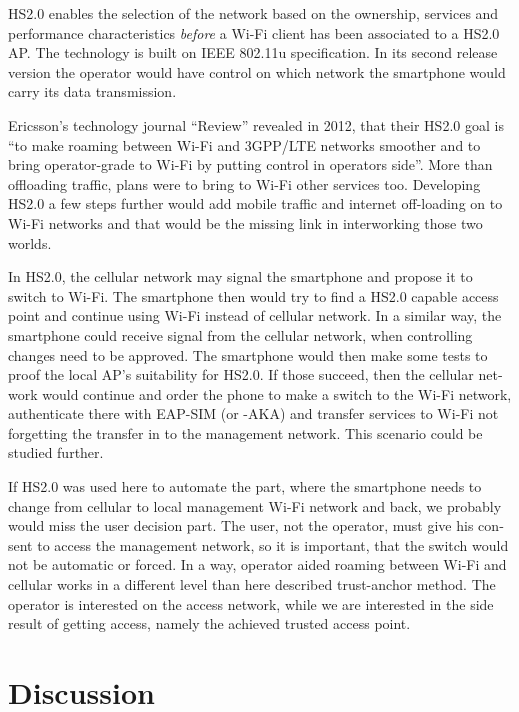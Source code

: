 \documentclass[12pt,a4paper,english]{tutthesis}
\begin{document}
\begin{otherlanguage}{english}
HS2.0
enables the selection of the network based on the ownership, services and
performance characteristics \emph{before} a Wi-Fi client has been associated
to a HS2.0 AP. The technology is built on IEEE 802.11u specification. 
In its second release version the operator would
have control on which network the smartphone would carry its data
transmission. 





Ericsson's technology journal ``Review'' revealed in 2012, that their 
HS2.0 goal is ``to make roaming between Wi-Fi and 3GPP/LTE networks smoother
and to bring operator-grade to Wi-Fi by putting control in operators side''. More
than offloading traffic, plans were to bring to Wi-Fi other services too\cite{er-seamless}.
Developing HS2.0 a few steps further would add mobile traffic and internet
off-loading on to Wi-Fi networks and that would be the missing link in
interworking those two worlds.



In HS2.0, the cellular network may signal the smartphone and
propose it to switch to Wi-Fi. The smartphone then would try to find a HS2.0 capable
access point and continue using Wi-Fi instead of cellular network.
In a similar way, the smartphone could receive signal from the cellular
network, when controlling changes need to be approved. The smartphone
would then make some tests to proof the local AP's suitability for 
HS2.0. If those succeed, then the cellular network would continue and order the 
phone to make a switch to the Wi-Fi network, authenticate there with 
EAP-SIM (or -AKA) and transfer services to Wi-Fi not forgetting 
the transfer in to the management network. This scenario could be 
studied further.


If HS2.0 was used here to automate the part, where
the smartphone needs to change from cellular to local
management Wi-Fi network and back, we probably would
miss the user decision part. The user, not the operator,
 must give his consent to access the management network, so
it is important, that the switch would not be automatic or forced.
In a way, operator aided roaming between Wi-Fi and cellular
works in a different level than here described trust-anchor method.
The operator is interested on the access network, while
we are interested in the side result of getting access, namely 
the achieved trusted access point.






\section{Discussion}
\label{sec-6-5}


\end{otherlanguage}
\end{document}
